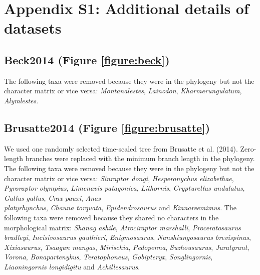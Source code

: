 \documentclass[12pt,a4paper]{article}
\begin{document}
\par{}

\setlength{\parindent}{1cm}

\section{Appendix S1: Additional details of datasets}

\subsection{Beck2014 (Figure \ref{figure:beck})}
The following taxa were removed because they were in the phylogeny but not the character matrix or vice versa: \textit{Montanalestes}, \textit{Lainodon}, \textit{Kharmerungulatum}, \textit{Alymlestes}. 

\subsection{Brusatte2014 (Figure \ref{figure:brusatte})} 
We used one randomly selected time-scaled tree from Brusatte et al. (2014).
Zero-length branches were replaced with the minimum branch length in the phylogeny.
The following taxa were removed because they were in the phylogeny but not the character matrix or vice versa: \textit{Sinraptor dongi}, \textit{Hesperonychus elizabethae}, \textit{Pyroraptor olympius}, \textit{Limenavis patagonica}, \textit{Lithornis}, \textit{Crypturellus undulatus}, \textit{Gallus gallus}, \textit{Crax pauxi}, \textit{Anas}\\ \textit{platyrhynchus}, \textit{Chauna torquata}, \textit{Epidendrosaurus} and \textit{Kinnareemimus}. 
The following taxa were removed because they shared no characters in the morphological matrix: \textit{Shanag ashile}, \textit{Atrociraptor marshalli}, \textit{Proceratosaurus bradleyi}, \textit{Incisivosaurus gauthieri}, \textit{Enigmosaurus}, \textit{Nanshiungosaurus brevispinus}, \textit{Xixiasaurus}, \textit{Tsaagan mangas}, \textit{Mirischia}, \textit{Pedopenna}, \textit{Suzhousaurus}, \textit{Juratyrant}, \textit{Vorona}, \textit{Bonapartenykus}, \textit{Teratophoneus}, \textit{Gobipteryx}, \textit{Songlingornis}, \textit{Liaoningornis longidigitu} and \textit{Achillesaurus}.   
\end{document}
